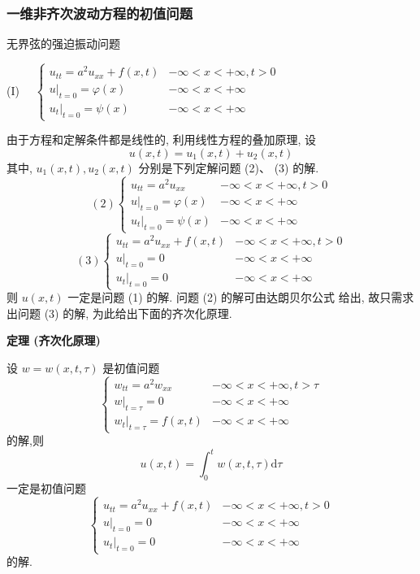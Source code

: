 \subsubsection{一维非齐次波动方程的初值问题}

无界弦的强迫振动问题

(I) $ \quad\left\{\begin{array}{ll}u_{t t}=a^{2} u_{x x}+f(x, t) & -\infty<x<+\infty, t>0 \\ \left.u\right|_{t=0}=\varphi(x) & -\infty<x<+\infty \\ \left.u_{t}\right|_{t=0}=\psi(x) & -\infty<x<+\infty\end{array}\right. $

由于方程和定解条件都是线性的, 利用线性方程的叠加原理, 设
$$
u(x, t)=u_{1}(x, t)+u_{2}(x, t)
$$
其中, $ u_{1}(x, t) , u_{2}(x, t) $ 分别是下列定解问题 (2)、 (3) 的解.
$$
(2)\left\{\begin{array}{ll}
u_{t t}=a^{2} u_{x x} & -\infty<x<+\infty, t>0 \\
\left.u\right|_{t=0}=\varphi(x) & -\infty<x<+\infty \\
\left.u_{t}\right|_{t=0}=\psi(x) & -\infty<x<+\infty
\end{array}\right. 
$$
$$
(3)\left\{\begin{array}{ll}
u_{t t}=a^{2} u_{x x}+f(x, t) & -\infty<x<+\infty, t>0 \\
\left.u\right|_{t=0}=0 & -\infty<x<+\infty \\
\left.u_{t}\right|_{t=0}=0 & -\infty<x<+\infty
\end{array}\right.
$$
则 $ u(x, t) $ 一定是问题 (1) 的解.
问题 (2) 的解可由达朗贝尔公式 给出, 故只需求出问题 (3) 的解, 为此给出下面的齐次化原理.

\textbf{定理 (齐次化原理)}

设 $ w=w(x, t, \tau) $ 是初值问题
$$
\left\{\begin{array}{ll}
w_{t t}=a^{2} w_{x x} & -\infty<x<+\infty, t>\tau \\
\left.w\right|_{t=\tau}=0 & -\infty<x<+\infty \\
\left.w_{t}\right|_{t=\tau}=f(x, t) & -\infty<x<+\infty
\end{array}\right.
$$
的解,则
$$
u(x, t)=\int_{0}^{t} w(x, t, \tau) \mathrm{d} \tau
$$
一定是初值问题
$$
\left\{\begin{array}{ll}
u_{t t}=a^{2} u_{x x}+f(x, t) & -\infty<x<+\infty, t>0 \\
\left.u\right|_{t=0}=0 & -\infty<x<+\infty \\
\left.u_{t}\right|_{t=0}=0 & -\infty<x<+\infty
\end{array}\right.
$$
的解.


